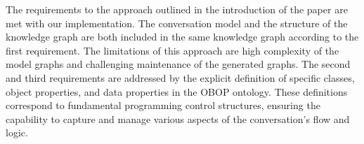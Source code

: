 \documentclass[runningheads]{llncs}
\begin{document}
The requirements to the approach outlined in the introduction of the paper are met with our implementation. The conversation model and the structure of the knowledge graph are both included in the same knowledge graph according to the first requirement. The limitations of this approach are high complexity of the model graphs and challenging maintenance of the generated graphs. The second and third requirements are addressed by the explicit definition of specific classes, object properties, and data properties in the OBOP ontology. These definitions correspond to fundamental programming control structures, ensuring the capability to capture and manage various aspects of the conversation's flow and logic.

%
%
%


%
\end{document}
